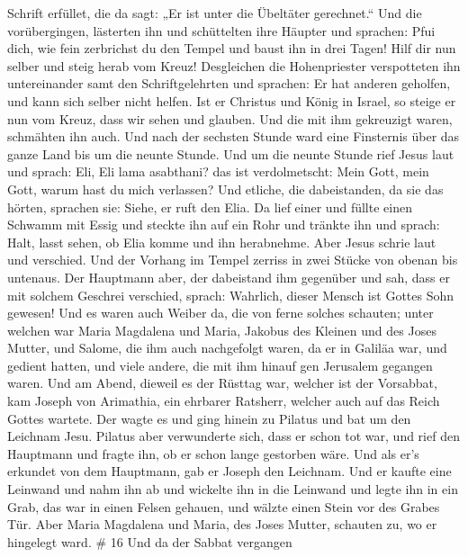 Schrift erfüllet, die da sagt: „Er ist unter die Übeltäter gerechnet.``
 Und die vorübergingen, lästerten ihn und schüttelten ihre
Häupter und sprachen: Pfui dich, wie fein zerbrichst du den Tempel und
baust ihn in drei Tagen!  Hilf dir nun selber und steig
herab vom Kreuz!  Desgleichen die Hohenpriester
verspotteten ihn untereinander samt den Schriftgelehrten und sprachen:
Er hat anderen geholfen, und kann sich selber nicht helfen.
 Ist er Christus und König in Israel, so steige er nun vom
Kreuz, dass wir sehen und glauben. Und die mit ihm gekreuzigt waren,
schmähten ihn auch.  Und nach der sechsten Stunde ward eine
Finsternis über das ganze Land bis um die neunte Stunde. 
Und um die neunte Stunde rief Jesus laut und sprach: Eli, Eli lama
asabthani? das ist verdolmetscht: Mein Gott, mein Gott, warum hast du
mich verlassen?  Und etliche, die dabeistanden, da sie das
hörten, sprachen sie: Siehe, er ruft den Elia.  Da lief
einer und füllte einen Schwamm mit Essig und steckte ihn auf ein Rohr
und tränkte ihn und sprach: Halt, lasst sehen, ob Elia komme und ihn
herabnehme.  Aber Jesus schrie laut und verschied.
 Und der Vorhang im Tempel zerriss in zwei Stücke von
obenan bis untenaus.  Der Hauptmann aber, der dabeistand
ihm gegenüber und sah, dass er mit solchem Geschrei verschied, sprach:
Wahrlich, dieser Mensch ist Gottes Sohn gewesen!  Und es
waren auch Weiber da, die von ferne solches schauten; unter welchen war
Maria Magdalena und Maria, Jakobus des Kleinen und des Joses Mutter, und
Salome,  die ihm auch nachgefolgt waren, da er in Galiläa
war, und gedient hatten, und viele andere, die mit ihm hinauf gen
Jerusalem gegangen waren.  Und am Abend, dieweil es der
Rüsttag war, welcher ist der Vorsabbat,  kam Joseph von
Arimathia, ein ehrbarer Ratsherr, welcher auch auf das Reich Gottes
wartete. Der wagte es und ging hinein zu Pilatus und bat um den Leichnam
Jesu.  Pilatus aber verwunderte sich, dass er schon tot
war, und rief den Hauptmann und fragte ihn, ob er schon lange gestorben
wäre.  Und als er's erkundet von dem Hauptmann, gab er
Joseph den Leichnam.  Und er kaufte eine Leinwand und nahm
ihn ab und wickelte ihn in die Leinwand und legte ihn in ein Grab, das
war in einen Felsen gehauen, und wälzte einen Stein vor des Grabes Tür.
 Aber Maria Magdalena und Maria, des Joses Mutter, schauten
zu, wo er hingelegt ward. \# 16  Und da der Sabbat vergangen
